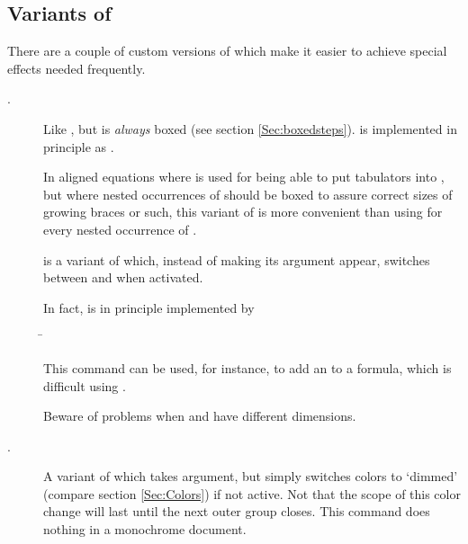   \subsection{Variants of }
  There are a couple of custom versions of  which make it easier to achieve special effects needed
  frequently.
  \begin{description}
  \item[.] Like , but is \emph{always} boxed (see section
    \ref{Sec:boxedsteps}).  is implemented in principle as
    .
    
    In aligned equations where  is used for being able to put tabulators into ,
    but where nested occurrences of  should be boxed to assure correct sizes of growing braces or such,
    this variant of  is more convenient than using  for every nested occurrence
    of .
    
  \item[] is a variant of  which,
    instead of making its argument appear, switches between  and  when activated.

    In fact,  is in principle implemented by
    \begin{tabbing}
      \=\\
      \>
    \end{tabbing}
    
    This command can be used, for instance, to add an  to a formula, which is difficult using
    . 
    
    Beware of problems when  and  have different dimensions.

    \newslide
    
  \item[.] A variant of  which takes  argument, but simply switches
    colors to `dimmed' (compare section \ref{Sec:Colors}) if not active. Not that the scope of this color change will
    last until the next outer group closes. This command does nothing in a monochrome document.
    

\end{description}
